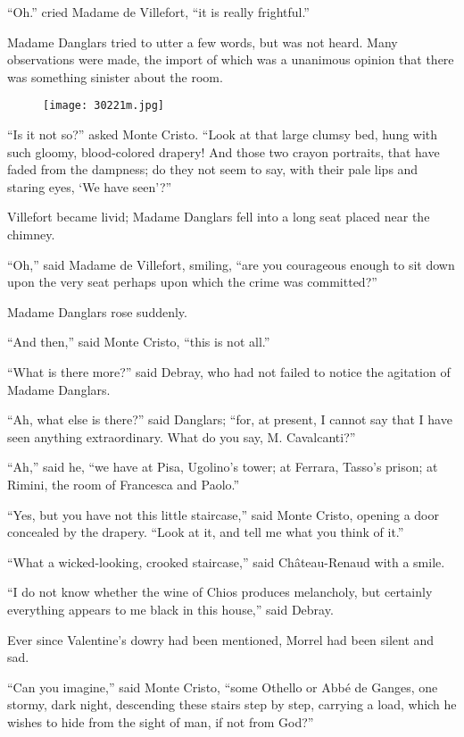 “Oh.” cried Madame de Villefort, “it is really frightful.”

Madame Danglars tried to utter a few words, but was not heard. Many
observations were made, the import of which was a unanimous opinion
that there was something sinister about the room.

\begin{figure}[ht]
\texttt{[image: 30221m.jpg]}
\end{figure}

“Is it not so?” asked Monte Cristo. “Look at that large clumsy bed,
hung with such gloomy, blood-colored drapery! And those two crayon
portraits, that have faded from the dampness; do they not seem to say,
with their pale lips and staring eyes, ‘We have seen’?”

Villefort became livid; Madame Danglars fell into a long seat placed
near the chimney.

“Oh,” said Madame de Villefort, smiling, “are you courageous enough to
sit down upon the very seat perhaps upon which the crime was
committed?”

Madame Danglars rose suddenly.

“And then,” said Monte Cristo, “this is not all.”

“What is there more?” said Debray, who had not failed to notice the
agitation of Madame Danglars.

“Ah, what else is there?” said Danglars; “for, at present, I cannot say
that I have seen anything extraordinary. What do you say, M.
Cavalcanti?”

“Ah,” said he, “we have at Pisa, Ugolino’s tower; at Ferrara, Tasso’s
prison; at Rimini, the room of Francesca and Paolo.”

“Yes, but you have not this little staircase,” said Monte Cristo,
opening a door concealed by the drapery. “Look at it, and tell me what
you think of it.”

“What a wicked-looking, crooked staircase,” said Château-Renaud with a
smile.

“I do not know whether the wine of Chios produces melancholy, but
certainly everything appears to me black in this house,” said Debray.

Ever since Valentine’s dowry had been mentioned, Morrel had been silent
and sad.

“Can you imagine,” said Monte Cristo, “some Othello or Abbé de Ganges,
one stormy, dark night, descending these stairs step by step, carrying
a load, which he wishes to hide from the sight of man, if not from
God?”

